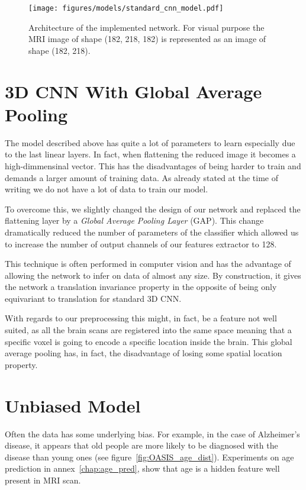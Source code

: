 \begin{figure}
    \centering
    \texttt{[image: figures/models/standard\_cnn\_model.pdf]}
    \caption{Architecture of the implemented network. For visual purpose the MRI image of shape (182, 218, 182) is represented as an image of shape (182, 218).}
    \label{fig:standard_cnn_model}
\end{figure}

\section{3D CNN With Global Average Pooling}

The model described above has quite a lot of parameters to learn especially due to the last linear layers. In fact, when flattening the reduced image it becomes a high-dimmensinal vector. This has the disadvantages of being harder to train and demands a larger amount of training data. As already stated at the time of writing we do not have a lot of data to train our model. 

To overcome this, we slightly changed the design of our network and replaced the flattening layer by a \textit{Global Average Pooling Layer}\cite{GAP_lin2013network} (GAP). This change dramatically reduced the number of parameters of the classifier which allowed us to increase the number of output channels of our features extractor to 128.  

This technique is often performed in computer vision and has the advantage of allowing the network to infer on data of almost any size. By construction, it gives the network a translation invariance property in the opposite of being only equivariant to translation for standard 3D CNN.

With regards to our preprocessing this might, in fact, be a feature not well suited, as all the brain scans are registered into the same space meaning that a specific voxel is going to encode a specific location inside the brain. This global average pooling has, in fact, the disadvantage of losing some spatial location property.


\section{Unbiased Model}
\label{sec:unbias_model}

Often the data has some underlying bias. For example, in the case of Alzheimer’s disease, it appears that old people are more likely to be diagnosed with the disease than young ones (see figure~\ref{fig:OASIS_age_dist}). Experiments on age prediction in annex~\ref{chap:age_pred}, show that age is a hidden feature well present in MRI scan.

